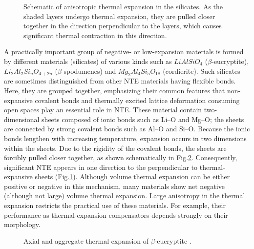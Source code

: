 \documentclass[12pt, a4paper, twocolumn]{article}
\begin{document}
\begin{figure}[h!]
\caption{Schematic of anisotropic thermal expansion in the silicates. As the shaded layers undergo thermal expansion, they are pulled closer together in the direction perpendicular to the layers, which causes significant thermal contraction in this direction.}
\label{ris2}
\end{figure}

A practically important group of negative- or low-expansion materials is formed by different materials (silicates) of various kinds such as $LiAlSiO_4$ ($\beta$-eucryptite)\cite{lit6}, $Li_2Al_2Si_nO_{4+2n}$ ($\beta$-spodumenes) \cite{lit4} and $Mg_2Al_4Si_5O_{18}$ (cordierite)\cite{lit2}. Such silicates are sometimes distinguished from other NTE materials having flexible bonds\cite{lit5}. Here, they are grouped together, emphasizing their common features that non-expansive covalent bonds and thermally excited lattice deformation consuming open spaces play an essential role in NTE. These material contain two-dimensional sheets composed of ionic bonds such as Li–O and Mg–O; the sheets are connected by strong covalent bonds such as Al–O and Si–O. Because the ionic bonds lengthen with increasing temperature, expansion occurs in two dimensions within the sheets. Due to the rigidity of the covalent bonds, the sheets are forcibly pulled closer together, as shown schematically in Fig.\ref{ris1}. Consequently, significant NTE appears in one direction to the perpendicular to thermal-expansive sheets (Fig.\ref{ris2}). Although volume thermal expansion can be either positive or negative in this mechanism, many materials show net negative (although not large) volume thermal expansion. Large anisotropy in the thermal expansion restricts the practical use of these materials. For example, their performance as thermal-expansion compensators depends strongly on their morphology\cite{lit1}.
\begin{figure}[h!]
\caption{Axial and aggregate thermal expansion of $\beta$-eucryptite \cite{lit6}.}
\label{ris1}
\end{figure}
\end{document}
